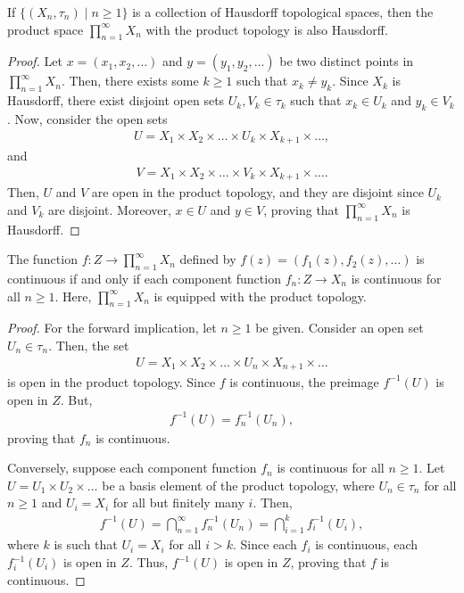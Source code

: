 \begin{lemma}
    If $\{(X_{n}, \tau_{n}) \mid n \geq 1\}$ is a collection of Hausdorff topological spaces, then the product space $\prod_{n=1}^{\infty} X_{n}$ with the product topology is also Hausdorff.
\end{lemma}
\begin{proof}
    Let $x = (x_{1}, x_{2}, \ldots)$ and $y = (y_{1}, y_{2}, \ldots)$ be two distinct points in $\prod_{n=1}^{\infty} X_{n}$. Then, there exists some $k \geq 1$ such that $x_{k} \neq y_{k}$. Since $X_{k}$ is Hausdorff, there exist disjoint open sets $U_{k}, V_{k} \in \tau_{k}$ such that $x_{k} \in U_{k}$ and $y_{k} \in V_{k}$. Now, consider the open sets
    \begin{align}
        U = X_{1} \times X_{2} \times \ldots \times U_{k} \times X_{k+1} \times \ldots,
    \end{align}
    and
    \begin{align}
        V = X_{1} \times X_{2} \times \ldots \times V_{k} \times X_{k+1} \times \ldots.
    \end{align}
    Then, $U$ and $V$ are open in the product topology, and they are disjoint since $U_{k}$ and $V_{k}$ are disjoint. Moreover, $x \in U$ and $y \in V$, proving that $\prod_{n=1}^{\infty} X_{n}$ is Hausdorff.
\end{proof}

\begin{lemma}
    The function $f:Z \to \prod_{n=1}^{\infty} X_{n}$ defined by $f(z) = (f_{1}(z), f_{2}(z), \ldots)$ is continuous if and only if each component function $f_{n} : Z \to X_{n}$ is continuous for all $n \geq 1$. Here, $\prod_{n=1}^{\infty} X_{n}$ is equipped with the product topology.
\end{lemma}
\begin{proof}
    For the forward implication, let $n \geq 1$ be given. Consider an open set $U_{n} \in \tau_{n}$. Then, the set
    \begin{align}
        U = X_{1} \times X_{2} \times \ldots \times U_{n} \times X_{n+1} \times \ldots
    \end{align}
    is open in the product topology. Since $f$ is continuous, the preimage $f^{-1}(U)$ is open in $Z$. But,
    \begin{align}
        f^{-1}(U) = f_{n}^{-1}(U_{n}),
    \end{align}
    proving that $f_{n}$ is continuous.

    Conversely, suppose each component function $f_{n}$ is continuous for all $n \geq 1$. Let $U = U_{1} \times U_{2} \times \ldots$ be a basis element of the product topology, where $U_{n} \in \tau_{n}$ for all $n \geq 1$ and $U_{i} = X_{i}$ for all but finitely many $i$. Then,
    \begin{align}
        f^{-1}(U) = \bigcap_{n=1}^{\infty} f_{n}^{-1}(U_{n}) = \bigcap_{i=1}^{k} f_{i}^{-1}(U_{i}),
    \end{align}
    where $k$ is such that $U_{i} = X_{i}$ for all $i > k$. Since each $f_{i}$ is continuous, each $f_{i}^{-1}(U_{i})$ is open in $Z$. Thus, $f^{-1}(U)$ is open in $Z$, proving that $f$ is continuous.
\end{proof}

